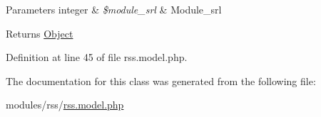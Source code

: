 \begin{DoxyParams}[1]{Parameters}
integer & {\em \$module\+\_\+srl} & Module\+\_\+srl \\
\hline
\end{DoxyParams}
\begin{DoxyReturn}{Returns}
\hyperlink{classObject}{Object} 
\end{DoxyReturn}


Definition at line 45 of file rss.\+model.\+php.



The documentation for this class was generated from the following file\+:\begin{DoxyCompactItemize}
\item 
modules/rss/\hyperlink{rss_8model_8php}{rss.\+model.\+php}\end{DoxyCompactItemize}
